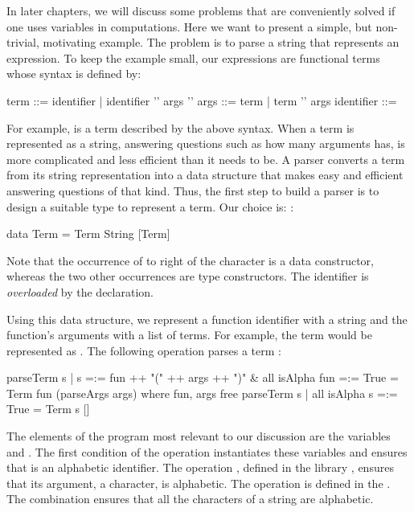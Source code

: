 In later chapters, we will discuss some problems that
are conveniently solved if one uses variables in computations.
Here we want to present a simple, but non-trivial, motivating example.
The problem is to parse a string that represents an expression.
To keep the example small, our expressions are functional terms
whose syntax is defined by:
%
\begin{prog}
term       ::= identifier
            |  identifier '\code{(}' args '\code{)}'
args       ::= term
            |  term '\code{,}' args
identifier ::= 
\end{prog}
%
For example,  is a term described
by the above syntax.
When a term is represented as a string,
answering questions such as how many arguments  has,
is more complicated and less efficient than it needs to be.
A parser converts a term from its string representation into
a data structure that
makes easy and efficient answering questions of that kind.
Thus, the first step to build a parser is to design a suitable type
to represent a term. Our choice is:
:
%
\begin{prog}
data Term = Term String [Term]
\end{prog}
%
Note that the occurrence of  to right of the \ccode{=}
character is a data constructor, whereas the two other occurrences
are type constructors.  The  identifier
is \emph{overloaded} by the declaration.

Using this data structure, we represent a function identifier with
a string and the function's arguments with a list of terms.  For
example, the term  would be represented as
.
The following operation parses a term
:
%
\begin{prog}
parseTerm s | s =:= fun ++ "(" ++ args ++ ")" \&
              all isAlpha fun =:= True = Term fun (parseArgs args)
  where fun, args free
\smallskip
parseTerm s | all isAlpha s =:= True = Term s []
\end{prog}
%
The elements of the program most relevant to our discussion are
the variables  and .
The first condition of the operation 
instantiates these variables and ensures that 
is an alphabetic identifier.
The operation , defined in the library ,
ensures that its argument, a character, is alphabetic.
The operation  is defined in the .
The combination  ensures that all the characters
of a string are alphabetic.

